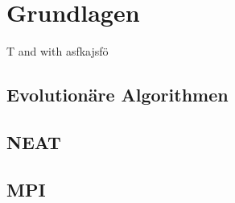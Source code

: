 \chapter{Grundlagen}



\ac{T} and \cite{stanley2002evolving} with \citeauthor{stanley2002evolving}
\newpage
asfkajsfö
\section{Evolutionäre Algorithmen}
\section{NEAT}
\section{MPI}